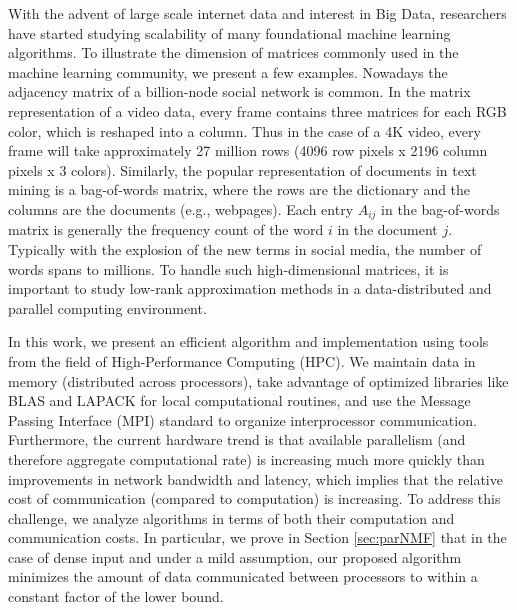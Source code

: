 With the advent of large scale internet data and interest in Big Data, researchers have started studying scalability of many foundational machine learning algorithms. 
To illustrate the dimension of matrices commonly used in the machine learning community, we present a few examples. 
Nowadays the adjacency matrix of a billion-node social network is common. 
In the matrix representation of a video data, every frame contains three matrices for each RGB color, which is reshaped into a column.  
Thus in the case of a 4K video, every frame will take approximately 27 million rows (4096 row pixels x 2196 column pixels x 3 colors). 
Similarly, the popular representation of documents in text mining is a bag-of-words matrix, where the rows are the dictionary and the columns are the documents (e.g., webpages). 
Each entry $A_{ij}$ in the bag-of-words matrix is generally the frequency count of the word $i$  in the document $j$. 
Typically with the explosion of the new terms in social media, the number of words spans to millions. 
To handle such high-dimensional matrices, it is important to study low-rank approximation methods in a data-distributed and parallel computing environment. 

In this work, we present an efficient algorithm and implementation using tools from the field of High-Performance Computing (HPC).
We maintain data in memory (distributed across processors), take advantage of optimized libraries like BLAS and LAPACK for local computational routines, and use the Message Passing Interface (MPI) standard to organize interprocessor communication.
Furthermore, the current hardware trend is that available parallelism (and therefore aggregate computational rate) is increasing much more quickly than improvements in network bandwidth and latency, which implies that the relative cost of communication (compared to computation) is increasing.
To address this challenge, we analyze algorithms in terms of both their computation and communication costs.
In particular, we prove in Section \ref{sec:parNMF} that in the case of dense input and under a mild assumption, our proposed algorithm minimizes the amount of data communicated between processors to within a constant factor of the lower bound.


